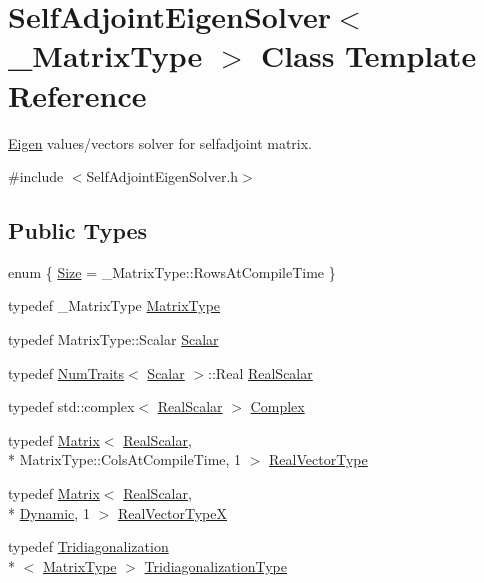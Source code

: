 \hypertarget{class_self_adjoint_eigen_solver}{\section{Self\-Adjoint\-Eigen\-Solver$<$ \-\_\-\-Matrix\-Type $>$ Class Template Reference}
\label{class_self_adjoint_eigen_solver}
}


\hyperlink{namespace_eigen}{Eigen} values/vectors solver for selfadjoint matrix.  




{\ttfamily \#include $<$Self\-Adjoint\-Eigen\-Solver.\-h$>$}

\subsection*{Public Types}
\begin{DoxyCompactItemize}
\item 
enum \{ \hyperlink{class_self_adjoint_eigen_solver_ad7b283bbf2a83c2e4e488922b6c17e4eabca9de2fa1974b39de30121c2be6e67a}{Size} = \-\_\-\-Matrix\-Type\-:\-:Rows\-At\-Compile\-Time
 \}
\item 
typedef \-\_\-\-Matrix\-Type \hyperlink{class_self_adjoint_eigen_solver_aa4841a3365da9edfb78e6aff605d7da8}{Matrix\-Type}
\item 
typedef Matrix\-Type\-::\-Scalar \hyperlink{class_self_adjoint_eigen_solver_a54a43d90cec5ee45bed941073e70556f}{Scalar}
\item 
typedef \hyperlink{struct_num_traits}{Num\-Traits}$<$ \hyperlink{class_self_adjoint_eigen_solver_a54a43d90cec5ee45bed941073e70556f}{Scalar} $>$\-::Real \hyperlink{class_self_adjoint_eigen_solver_a4f5e61b89882e72b13843e9817226f6a}{Real\-Scalar}
\item 
typedef std\-::complex$<$ \hyperlink{class_self_adjoint_eigen_solver_a4f5e61b89882e72b13843e9817226f6a}{Real\-Scalar} $>$ \hyperlink{class_self_adjoint_eigen_solver_a20bd3ba42d667035e1dded3d16af3a3c}{Complex}
\item 
typedef \hyperlink{class_matrix}{Matrix}$<$ \hyperlink{class_self_adjoint_eigen_solver_a4f5e61b89882e72b13843e9817226f6a}{Real\-Scalar}, \\*
Matrix\-Type\-::\-Cols\-At\-Compile\-Time, 1 $>$ \hyperlink{class_self_adjoint_eigen_solver_ac519b1b30c0460a1485c38dcd6891d6e}{Real\-Vector\-Type}
\item 
typedef \hyperlink{class_matrix}{Matrix}$<$ \hyperlink{class_self_adjoint_eigen_solver_a4f5e61b89882e72b13843e9817226f6a}{Real\-Scalar}, \\*
\hyperlink{_constants_8h_adc9da5be31bdce40c25a92c27999c0e3}{Dynamic}, 1 $>$ \hyperlink{class_self_adjoint_eigen_solver_a44e49c03031e4e3aabc160f237e205f6}{Real\-Vector\-Type\-X}
\item 
typedef \hyperlink{class_tridiagonalization}{Tridiagonalization}\\*
$<$ \hyperlink{class_self_adjoint_eigen_solver_aa4841a3365da9edfb78e6aff605d7da8}{Matrix\-Type} $>$ \hyperlink{class_self_adjoint_eigen_solver_ac288a7aa494c8479c2783c48304fa928}{Tridiagonalization\-Type}
\end{DoxyCompactItemize}
